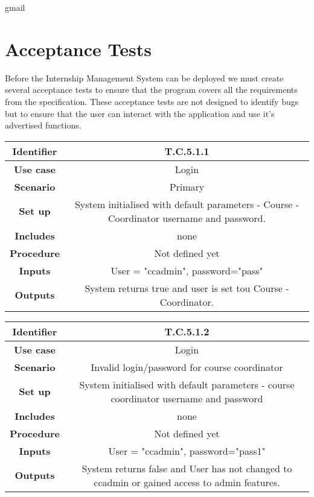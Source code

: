 gmail
\section{Acceptance Tests}

Before the Internship Management System can be deployed we must create several acceptance tests to ensure that the program covers all the requirements from the specification. These acceptance tests are not designed to identify bugs but to ensure that the user can interact with the application and use it's advertised functions.\\

\begin{tabular}{|c|c|}
\hline \textbf{Identifier} & T.C.5.1.1\\
\hline \textbf{Use case} & Login \\
\hline \textbf{Scenario} & Primary \\
\hline \textbf{Set up} & System initialised with default parameters - Course - Coordinator username and password.\\
\hline \textbf{Includes} & none\\
\hline \textbf{Procedure} & Not defined yet\\
\hline \textbf{Inputs} & User = "ccadmin", password="pass"\\
\hline \textbf{Outputs} & System returns true and user is set tou Course - Coordinator.\\
\hline
\end{tabular}

\begin{tabular}{|c|c|}
\hline \textbf{Identifier} & T.C.5.1.2 \\
\hline \textbf{Use case} & Login\\
\hline \textbf{Scenario} & Invalid login/password for course coordinator\\
\hline \textbf{Set up} & System initialised with default parameters - course coordinator username and password\\
\hline \textbf{Includes} & none\\
\hline \textbf{Procedure} & Not defined yet\\
\hline \textbf{Inputs} & User = "ccadmin", password="pass1"\\
\hline \textbf{Outputs} & System returns false and User has not changed to ccadmin or gained access to admin features.\\
\hline
\end{tabular}

